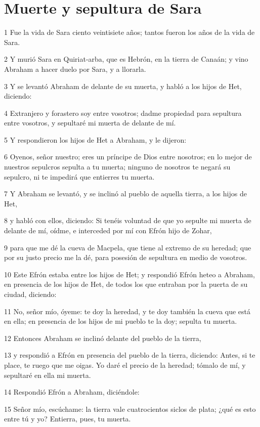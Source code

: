 \section{Muerte y sepultura de Sara}

1 Fue la vida de Sara ciento veintisiete años; tantos fueron los años de la vida de Sara.

2 Y murió Sara en Quiriat-arba, que es Hebrón, en la tierra de Canaán; y vino Abraham a hacer duelo por Sara, y a llorarla.

3 Y se levantó Abraham de delante de su muerta, y habló a los hijos de Het, diciendo:

4 Extranjero y forastero soy entre vosotros; dadme propiedad para sepultura entre vosotros, y sepultaré mi muerta de delante de mí.

5 Y respondieron los hijos de Het a Abraham, y le dijeron:

6 Oyenos, señor nuestro; eres un príncipe de Dios entre nosotros; en lo mejor de nuestros sepulcros sepulta a tu muerta; ninguno de nosotros te negará su sepulcro, ni te impedirá que entierres tu muerta.

7 Y Abraham se levantó, y se inclinó al pueblo de aquella tierra, a los hijos de Het,

8 y habló con ellos, diciendo: Si tenéis voluntad de que yo sepulte mi muerta de delante de mí, oídme, e interceded por mí con Efrón hijo de Zohar,

9 para que me dé la cueva de Macpela, que tiene al extremo de su heredad; que por su justo precio me la dé, para posesión de sepultura en medio de vosotros.

10 Este Efrón estaba entre los hijos de Het; y respondió Efrón heteo a Abraham, en presencia de los hijos de Het, de todos los que entraban por la puerta de su ciudad, diciendo:

11 No, señor mío, óyeme: te doy la heredad, y te doy también la cueva que está en ella; en presencia de los hijos de mi pueblo te la doy; sepulta tu muerta.

12 Entonces Abraham se inclinó delante del pueblo de la tierra,

13 y respondió a Efrón en presencia del pueblo de la tierra, diciendo: Antes, si te place, te ruego que me oigas. Yo daré el precio de la heredad; tómalo de mí, y sepultaré en ella mi muerta.

14 Respondió Efrón a Abraham, diciéndole:

15 Señor mío, escúchame: la tierra vale cuatrocientos siclos de plata; ¿qué es esto entre tú y yo? Entierra, pues, tu muerta.

